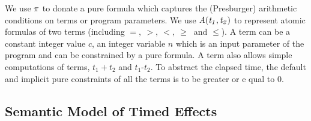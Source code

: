 \documentclass[acmsmall,10pt,review]{acmart}
\newcommand\pure[1]{ \textcolor{black}{#1}}
\newcommand{\code}[1]{{\tt{\ensuremath{\m{#1}}}}}
\newcommand{\m}{\mathit}
\begin{document}
{We use \code{\pure{\pi}} to donate a pure formula which captures the (Presburger) arithmetic conditions on terms or program parameters. 
We use \code{\pure{A(}{t_1, t_2}\pure{)}} to represent atomic formulas of two terms (including $  {=},
   \ {>},
   \ {<},
   \ {\geq}\ $ and $ {\leq} $).
A term can be a constant integer value \code{c}, an integer variable \code{n} which is an input parameter of the program and can be constrained by a pure formula. 
A term also allows simple computations of terms, \code{t_1{+}t_2} and \code{t_1\text{-}t_2}. To abstract the elapsed time, the default and implicit pure constraints of all the terms is to be greater or e
qual to  0. 


\subsection{Semantic Model of Timed Effects}
\label{subsec:Specification_Semantics}





}
\end{document}
